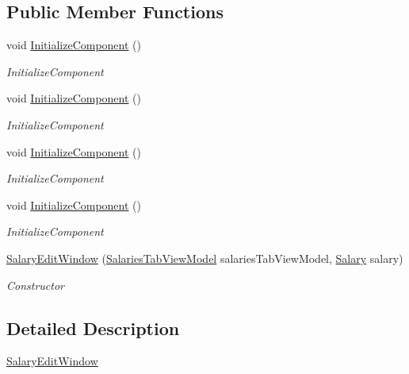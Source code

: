 \subsection*{Public Member Functions}
\begin{DoxyCompactItemize}
\item 
void \hyperlink{class_baudi_1_1_client_1_1_view_1_1_edit_windows_1_1_salary_edit_window_a031018cb1ea7f3fc37ada01abc2b50b0}{Initialize\+Component} ()
\begin{DoxyCompactList}\small\item\em Initialize\+Component \end{DoxyCompactList}\item 
void \hyperlink{class_baudi_1_1_client_1_1_view_1_1_edit_windows_1_1_salary_edit_window_a031018cb1ea7f3fc37ada01abc2b50b0}{Initialize\+Component} ()
\begin{DoxyCompactList}\small\item\em Initialize\+Component \end{DoxyCompactList}\item 
void \hyperlink{class_baudi_1_1_client_1_1_view_1_1_edit_windows_1_1_salary_edit_window_a031018cb1ea7f3fc37ada01abc2b50b0}{Initialize\+Component} ()
\begin{DoxyCompactList}\small\item\em Initialize\+Component \end{DoxyCompactList}\item 
void \hyperlink{class_baudi_1_1_client_1_1_view_1_1_edit_windows_1_1_salary_edit_window_a031018cb1ea7f3fc37ada01abc2b50b0}{Initialize\+Component} ()
\begin{DoxyCompactList}\small\item\em Initialize\+Component \end{DoxyCompactList}\item 
\hyperlink{class_baudi_1_1_client_1_1_view_1_1_edit_windows_1_1_salary_edit_window_ab76b4e1a614de6f9d7b3a08a942de498}{Salary\+Edit\+Window} (\hyperlink{class_baudi_1_1_client_1_1_view_models_1_1_tabs_view_models_1_1_salaries_tab_view_model}{Salaries\+Tab\+View\+Model} salaries\+Tab\+View\+Model, \hyperlink{class_baudi_1_1_d_a_l_1_1_models_1_1_salary}{Salary} salary)
\begin{DoxyCompactList}\small\item\em Constructor \end{DoxyCompactList}\end{DoxyCompactItemize}


\subsection{Detailed Description}
\hyperlink{class_baudi_1_1_client_1_1_view_1_1_edit_windows_1_1_salary_edit_window}{Salary\+Edit\+Window} 

